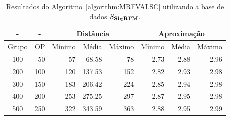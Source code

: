 \begin{table}[!htb]
  \caption{Resultados do Algoritmo~\ref{algorithm:MRFVALSC} utilizando a base de dados $S_{\textbf{Sb\textsubscript{I}RTM}}{}$.}
  \label{table:GLCTFFPM}
  \centering
  \begin{tabular}{|c|r|r|r|r|r|r|r|}
    \hline
      -      & \multicolumn{1}{c|}{-} & \multicolumn{3}{c|}{Distância}             & \multicolumn{3}{c|}{Aproximação}           \\ \hline
    Grupo    & OP                     & Mínimo       & Média        & Máximo       & Mínimo       & Média        & Máximo       \\ \hline  
    100      & 50                     & 57           & 68.58        & 78           & 2.73         & 2.88         & 2.96         \\ \hline
    200      & 100                    & 120          & 137.53       & 152          & 2.82         & 2.93         & 2.98         \\ \hline
    300      & 150                    & 183          & 206.42       & 224          & 2.85         & 2.94         & 2.98         \\ \hline
    400      & 200                    & 253          & 275.25       & 297          & 2.87         & 2.95         & 2.98         \\ \hline
    500      & 250                    & 322          & 343.59       & 363          & 2.88         & 2.95         & 2.99         \\ \hline    
  \end{tabular}
\end{table}
